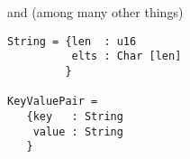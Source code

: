 \documentclass[svgnames]{llncs}
\begin{document}
\begin{enumerate}
\noindent and (among many other things)
\begin{verbatim}
String = {len  : u16
          elts : Char [len]
         }

KeyValuePair =
   {key   : String
    value : String
   }
\end{verbatim}

\end{enumerate}





\end{document}
